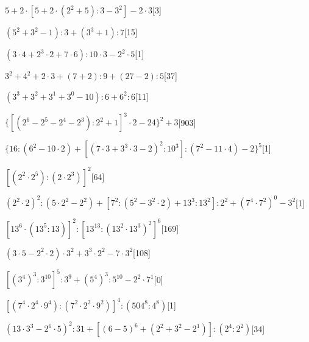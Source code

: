 \begin{esercizio} \label{ese:1.17}
\(5+2\cdot[5+2\cdot(2^2+5):3-3^2]-2\cdot3\)\hfill[3]
\end{esercizio}
\begin{esercizio} \label{ese:1.17}
\((5^2+3^2-1):3+(3^3+1):7\)\hfill[15]
\end{esercizio}
\begin{esercizio} \label{ese:1.17}
\((3\cdot4+2^3\cdot2+7\cdot6):10\cdot3-2^2\cdot5\)\hfill[1]
\end{esercizio}
\begin{esercizio} \label{ese:1.17}
\(3^2+4^2+2\cdot3+(7+2):9+(27-2):5\)\hfill[37]
\end{esercizio}
\begin{esercizio} \label{ese:1.17}
\((3^3+3^2+3^1+3^0-10):6+6^2:6\)\hfill[11]
\end{esercizio}
\begin{esercizio} \label{ese:1.17}
\(\{[(2^6-2^5-2^4-2^3):2^2+1]^3\cdot2-24\}^2+3\)\hfill[903]
\end{esercizio}
\begin{esercizio} \label{ese:1.17}
\(\{16:(6^2-10\cdot2)+[(7\cdot3+3^3\cdot3-2)^2:10^3]:(7^2-11\cdot4)-2\}^5\)\hfill[1]
\end{esercizio}
\begin{esercizio} \label{ese:1.17}
\([(2^2\cdot2^5):(2\cdot2^3)]^2\)\hfill[64]
\end{esercizio}
\begin{esercizio} \label{ese:1.17}
\((2^2\cdot2)^2:(5\cdot2^2-2^2)+[7^2:(5^2-3^2\cdot2)+13^3:13^2]:2^2+(7^4\cdot7^2)^0-3^2\)\hfill[1]
\end{esercizio}
\begin{esercizio} \label{ese:1.17}
\([13^6\cdot(13^5:13)]^2:[13^{13}:(13^2\cdot13^3)^2]^6\)\hfill[169]
\end{esercizio}
\begin{esercizio} \label{ese:1.17}
\((3\cdot5-2^2\cdot2)\cdot3^2+3^3\cdot2^2-7\cdot3^2\)\hfill[108]
\end{esercizio}
\begin{esercizio} \label{ese:1.17}
\([(3^4)^3:3^{10}]^5:3^9+(5^4)^3:5^{10}-2^2\cdot7^1\)\hfill[0]
\end{esercizio}
\begin{esercizio} \label{ese:1.17}
\([(7^4\cdot2^4\cdot9^4):(7^2\cdot2^2\cdot9^2)]^4:(504^8:4^8)\)\hfill[1]
\end{esercizio}
\begin{esercizio} \label{ese:1.17}
\((13\cdot3^3-2^6\cdot5)^2:31+[(6-5)^6+(2^2+3^2-2^1)]:(2^4:2^2)\)\hfill[34]
\end{esercizio}
